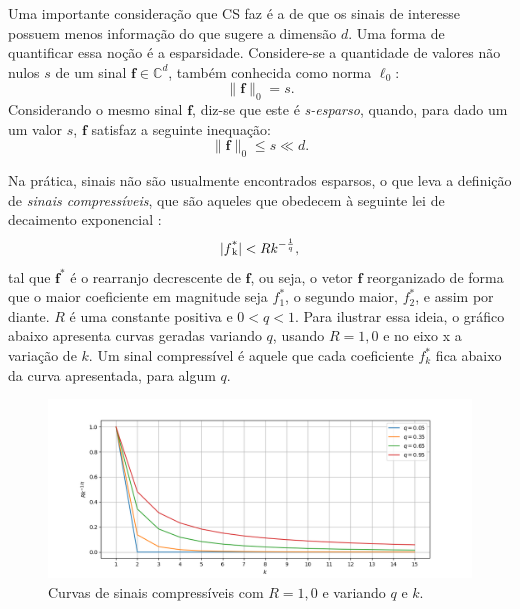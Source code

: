 \documentclass[cic,tc]{iiufrgs}
\def\SPSB#1#2{\rlap{\textsuperscript{#1}}\SB{#2}}
\def\SB#1{\textsubscript{#1}}
\renewcommand{\vec}[1]{\bm{#1}}
\begin{document}
Uma importante consideração que CS faz é a de que os sinais de interesse possuem menos informação do que sugere a 
dimensão $d$. 
Uma forma de quantificar essa noção é a esparsidade.
Considere-se a quantidade de valores não
nulos $s$ de um sinal $\vec{f} \in \mathbb{C}^d$, também conhecida como norma $\ell_0$:
\begin{equation}
    \lVert \vec{f} \rVert_0 = s.
\end{equation}
Considerando o mesmo sinal $\vec{f}$, diz-se que este é \textit{s-esparso}, quando, para dado um um valor $s$, $\vec{f}$
satisfaz a seguinte inequação:
\begin{equation}
    \label{eq:f0less}
    \lVert \vec{f} \rVert_0 \le s \ll d.
\end{equation} 

Na prática, sinais não são usualmente encontrados esparsos, o que leva a definição de \textit{sinais compressíveis},
que são aqueles que obedecem à seguinte lei de decaimento exponencial \cite{chen2015compressed}:
\begin{equation}
    \label{eq:compressiblesignal}
    | f\SPSB{*}{k} | < R k^{-\frac{1}{q}},  
\end{equation}
tal que $\vec{f}^* $ é o rearranjo decrescente de $\vec{f}$, ou seja, o vetor $\vec{f}$ reorganizado de forma que o maior 
coeficiente em magnitude seja $f_1^*$, o segundo maior, $f_2^*$, e assim por diante. $R$ é uma constante positiva e $0< q < 1$. 
Para ilustrar essa ideia, o gráfico abaixo apresenta curvas geradas variando $q$, usando $R=1,0$
e no eixo x a variação de $k$.
Um sinal compressível é aquele que cada coeficiente $f_k^*$ fica abaixo da curva apresentada,
para algum $q$. 
\begin{figure}[H]
    \caption{Curvas de sinais compressíveis com $R=1,0$ e variando $q$ e $k$.}
    \begin{center}
        \includegraphics[width=\textwidth]{img/rkq.png}
    \end{center}
\end{figure}
\end{document}
